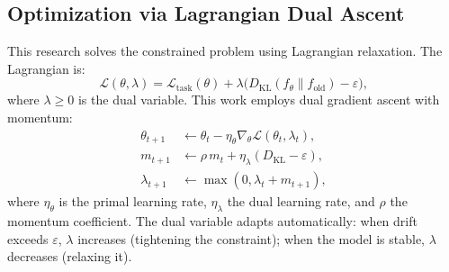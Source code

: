 \documentclass[11pt]{article}
\newcommand{\eps}{\varepsilon}
\newcommand{\DKL}{D_{\mathrm{KL}}}
\begin{document}
\subsection{Optimization via Lagrangian Dual Ascent}
This research solves the constrained problem using Lagrangian relaxation. The Lagrangian
is:
\begin{equation}
\mathcal{L}(\theta,\lambda) = \mathcal{L}_{\mathrm{task}}(\theta)
+ \lambda\big(\DKL(f_\theta\|f_{\mathrm{old}}) - \eps\big),
\label{eq:lagrangian}
\end{equation}
where $\lambda \ge 0$ is the dual variable. This work employs dual gradient ascent
with momentum:
\begin{align}
\theta_{t+1} &\leftarrow \theta_t - \eta_\theta \nabla_\theta \mathcal{L}(\theta_t,\lambda_t), \\
m_{t+1} &\leftarrow \rho\, m_t + \eta_\lambda (\DKL - \eps), \\
\lambda_{t+1} &\leftarrow \max(0, \lambda_t + m_{t+1}),
\label{eq:dual_ascent}
\end{align}
where $\eta_\theta$ is the primal learning rate, $\eta_\lambda$ the dual
learning rate, and $\rho$ the momentum coefficient. The dual variable adapts
automatically: when drift exceeds $\eps$, $\lambda$ increases (tightening the
constraint); when the model is stable, $\lambda$ decreases (relaxing it).
\end{document}
